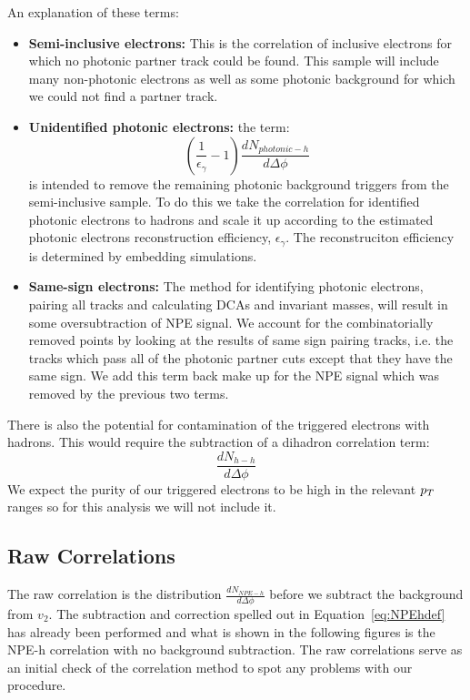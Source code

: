 An explanation of these terms:

\begin{itemize}
\item \textbf{Semi-inclusive electrons:} This is the correlation of inclusive electrons for which no photonic partner track could be found. This sample will include many non-photonic electrons as well as some photonic background for which we could not find a partner track. 
\item \textbf{Unidentified photonic electrons:} the term: \[ \left(\frac{1}{\epsilon_{\gamma}} - 1\right)\frac{dN_{photonic-h}}{d\Delta\phi} \] is intended to remove the remaining photonic background triggers from the semi-inclusive sample. To do this we take the correlation for identified photonic electrons to hadrons and scale it up according to the estimated photonic electrons reconstruction efficiency, $\epsilon_{\gamma}$. The reconstruciton efficiency is determined by embedding simulations.  
\item \textbf{Same-sign electrons:} The method for identifying photonic electrons, pairing all tracks and calculating DCAs and invariant masses, will result in some oversubtraction of NPE signal. We account for the combinatorially removed points by looking at the results of same sign pairing tracks, i.e. the tracks which pass all of the photonic partner cuts except that they have the same sign. We add this term back make up for the NPE signal which was removed by the previous two terms. 
\end{itemize}

There is also the potential for contamination of the triggered electrons with hadrons. This would require the subtraction of a dihadron correlation term: \[\frac{dN_{h-h}}{d\Delta\phi}\] We expect the purity of our triggered electrons to be high in the relevant $p_{T}$ ranges so for this analysis we will not include it. 

\subsection{Raw Correlations}

The raw correlation is the distribution $\frac{dN_{NPE-h}}{d\Delta\phi}$ before we subtract the background from $v_2$. The subtraction and correction spelled out in Equation~\ref{eq:NPEhdef} has already been performed and what is shown in the following figures is the NPE-h correlation with no background subtraction. The raw correlations serve as an initial check of the correlation method to spot any problems with our procedure. 

